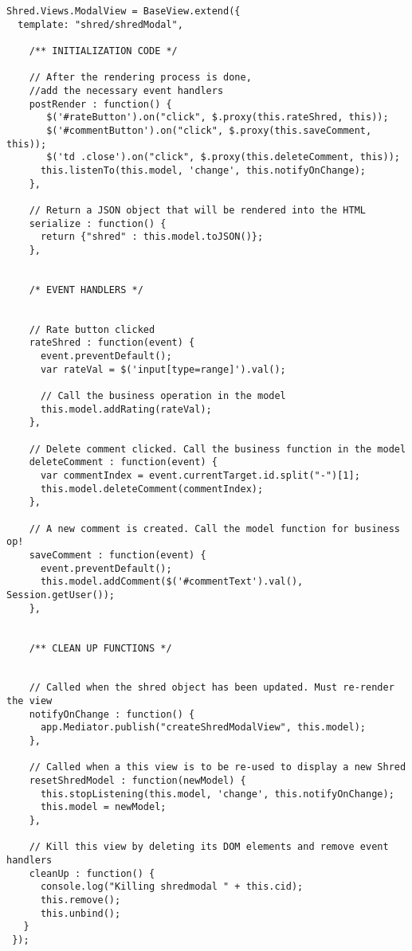\begin{lstlisting}
Shred.Views.ModalView = BaseView.extend({
  template: "shred/shredModal",

    /** INITIALIZATION CODE */

    // After the rendering process is done, 
    //add the necessary event handlers
    postRender : function() {
       $('#rateButton').on("click", $.proxy(this.rateShred, this));
       $('#commentButton').on("click", $.proxy(this.saveComment, this));
       $('td .close').on("click", $.proxy(this.deleteComment, this));
      this.listenTo(this.model, 'change', this.notifyOnChange);
    },

    // Return a JSON object that will be rendered into the HTML
    serialize : function() {
      return {"shred" : this.model.toJSON()};
    },


    /* EVENT HANDLERS */


    // Rate button clicked
    rateShred : function(event) {
      event.preventDefault();
      var rateVal = $('input[type=range]').val();

      // Call the business operation in the model
      this.model.addRating(rateVal);
    },    

    // Delete comment clicked. Call the business function in the model 
    deleteComment : function(event) {
      var commentIndex = event.currentTarget.id.split("-")[1];
      this.model.deleteComment(commentIndex);
    },
    
    // A new comment is created. Call the model function for business op!
    saveComment : function(event) {
      event.preventDefault();
      this.model.addComment($('#commentText').val(), Session.getUser());
    },


    /** CLEAN UP FUNCTIONS */


    // Called when the shred object has been updated. Must re-render the view
    notifyOnChange : function() {
      app.Mediator.publish("createShredModalView", this.model);
    },

    // Called when a this view is to be re-used to display a new Shred
    resetShredModel : function(newModel) {
      this.stopListening(this.model, 'change', this.notifyOnChange);
      this.model = newModel;
    },

    // Kill this view by deleting its DOM elements and remove event handlers 
    cleanUp : function() {
      console.log("Killing shredmodal " + this.cid);
      this.remove();
      this.unbind();
   }
 });
\end{lstlisting}



